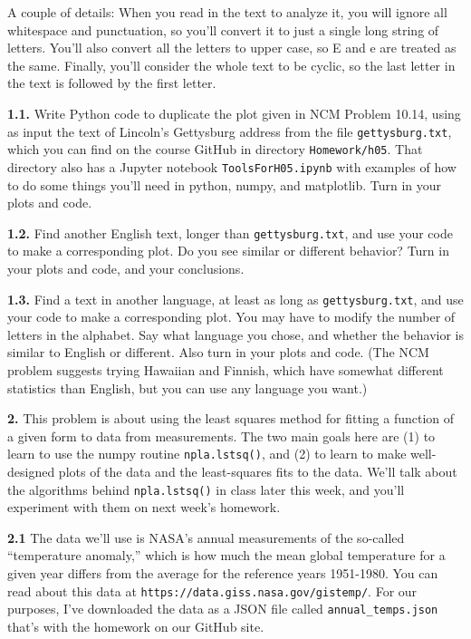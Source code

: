 \documentclass[11pt]{article}
\begin{document}
A couple of details:
When you read in the text to analyze it, you will ignore all whitespace and punctuation,
so you'll convert it to just a single long string of letters.
You'll also convert all the letters to upper case, so E and e are treated as the same.
Finally, you'll consider the whole text to be cyclic, so the last letter in the text is
followed by the first letter.

\par\medskip
{\bf 1.1.}
Write Python code to duplicate the plot given in NCM Problem 10.14, 
using as input the text of Lincoln's Gettysburg address from the file 
{\tt gettysburg.txt}, which you can find on the course GitHub
in directory {\tt Homework/h05}.
That directory also has a Jupyter notebook {\tt ToolsForH05.ipynb} with 
examples of how to do some things you'll need in python, numpy, and matplotlib.
Turn in your plots and code.

\par\medskip
{\bf 1.2.}
Find another English text, longer than {\tt gettysburg.txt},
and use your code to make a corresponding plot.
Do you see similar or different behavior?
Turn in your plots and code, and your conclusions.

\par\medskip
{\bf 1.3.}
Find a text in another language, at least as long as {\tt gettysburg.txt},
and use your code to make a corresponding plot.
You may have to modify the number of letters in the alphabet.
Say what language you chose, and whether the behavior is similar to English or different.
Also turn in your plots and code.
(The NCM problem suggests trying Hawaiian and Finnish, 
which have somewhat different statistics than English,
but you can use any language you want.)

\par\bigskip
{\bf 2.}
This problem is about using the least squares method for fitting a function of a given
form to data from measurements. The two main goals here are (1) to learn to use the
numpy routine {\tt npla.lstsq()}, and (2) to learn to make well-designed plots of the
data and the least-squares fits to the data. We'll talk about the algorithms behind
{\tt npla.lstsq()} in class later this week, and you'll experiment with them on next
week's homework.

\par\medskip
{\bf 2.1}
The data we'll use is NASA's annual measurements of the so-called ``temperature anomaly,''
which is how much the mean global temperature for a given year differs from the average
for the reference years 1951-1980. You can read about this data at 
{\tt https://data.giss.nasa.gov/gistemp/}. For our purposes, I've downloaded the data
as a JSON file called {\tt annual\_temps.json} that's with the homework on our GitHub site.
\end{document}
